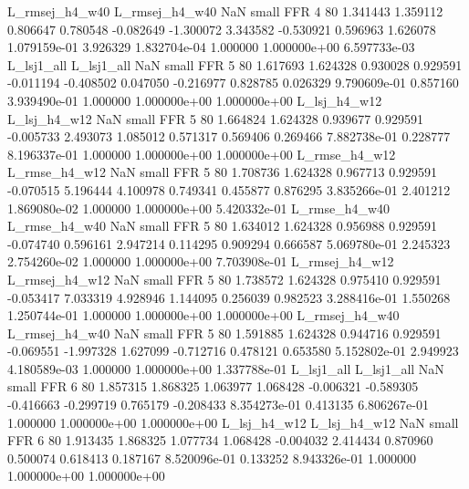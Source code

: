 L_rmsej_h4_w40 L_rmsej_h4_w40                   NaN      small      FFR                 4 80 1.341443       1.359112 0.806647       0.780548   -0.082649     -1.300072      3.343582    -0.530921       0.596963  1.626078 1.079159e-01     3.926329   1.832704e-04            1.000000    1.000000e+00        6.597733e-03
    L_lsj1_all     L_lsj1_all                   NaN      small      FFR                 5 80 1.617693       1.624328 0.930028       0.929591   -0.011194     -0.408502      0.047050    -0.216977       0.828785  0.026329 9.790609e-01     0.857160   3.939490e-01            1.000000    1.000000e+00        1.000000e+00
  L_lsj_h4_w12   L_lsj_h4_w12                   NaN      small      FFR                 5 80 1.664824       1.624328 0.939677       0.929591   -0.005733      2.493073      1.085012     0.571317       0.569406  0.269466 7.882738e-01     0.228777   8.196337e-01            1.000000    1.000000e+00        1.000000e+00
 L_rmse_h4_w12  L_rmse_h4_w12                   NaN      small      FFR                 5 80 1.708736       1.624328 0.967713       0.929591   -0.070515      5.196444      4.100978     0.749341       0.455877  0.876295 3.835266e-01     2.401212   1.869080e-02            1.000000    1.000000e+00        5.420332e-01
 L_rmse_h4_w40  L_rmse_h4_w40                   NaN      small      FFR                 5 80 1.634012       1.624328 0.956988       0.929591   -0.074740      0.596161      2.947214     0.114295       0.909294  0.666587 5.069780e-01     2.245323   2.754260e-02            1.000000    1.000000e+00        7.703908e-01
L_rmsej_h4_w12 L_rmsej_h4_w12                   NaN      small      FFR                 5 80 1.738572       1.624328 0.975410       0.929591   -0.053417      7.033319      4.928946     1.144095       0.256039  0.982523 3.288416e-01     1.550268   1.250744e-01            1.000000    1.000000e+00        1.000000e+00
L_rmsej_h4_w40 L_rmsej_h4_w40                   NaN      small      FFR                 5 80 1.591885       1.624328 0.944716       0.929591   -0.069551     -1.997328      1.627099    -0.712716       0.478121  0.653580 5.152802e-01     2.949923   4.180589e-03            1.000000    1.000000e+00        1.337788e-01
    L_lsj1_all     L_lsj1_all                   NaN      small      FFR                 6 80 1.857315       1.868325 1.063977       1.068428   -0.006321     -0.589305     -0.416663    -0.299719       0.765179 -0.208433 8.354273e-01     0.413135   6.806267e-01            1.000000    1.000000e+00        1.000000e+00
  L_lsj_h4_w12   L_lsj_h4_w12                   NaN      small      FFR                 6 80 1.913435       1.868325 1.077734       1.068428   -0.004032      2.414434      0.870960     0.500074       0.618413  0.187167 8.520096e-01     0.133252   8.943326e-01            1.000000    1.000000e+00        1.000000e+00
